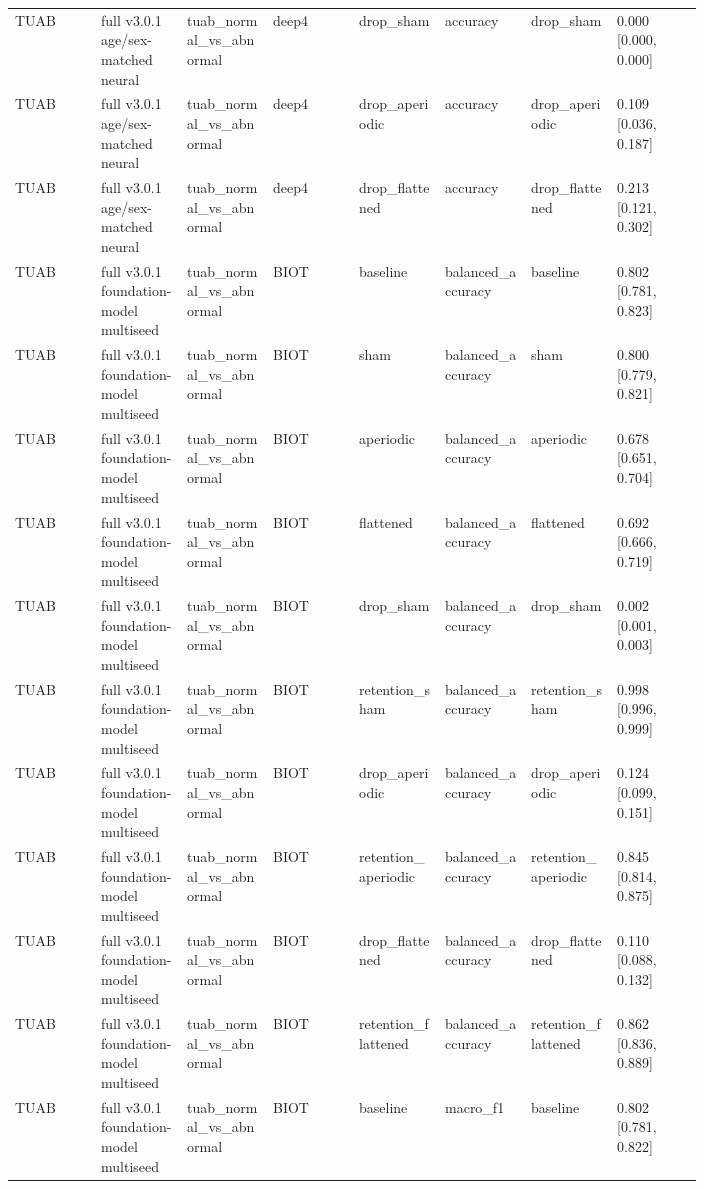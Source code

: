 \begin{longtable}{p{0.10\linewidth}p{0.10\linewidth}p{0.10\linewidth}p{0.10\linewidth}p{0.10\linewidth}p{0.10\linewidth}p{0.10\linewidth}p{0.10\linewidth}}
TUAB & full v3.0.1 age/sex-matched neural & tuab\_normal\_vs\_abnormal & deep4 & drop\_sham & accuracy & drop\_sham & 0.000 [0.000, 0.000]\\
TUAB & full v3.0.1 age/sex-matched neural & tuab\_normal\_vs\_abnormal & deep4 & drop\_aperiodic & accuracy & drop\_aperiodic & 0.109 [0.036, 0.187]\\
TUAB & full v3.0.1 age/sex-matched neural & tuab\_normal\_vs\_abnormal & deep4 & drop\_flattened & accuracy & drop\_flattened & 0.213 [0.121, 0.302]\\
TUAB & full v3.0.1 foundation-model multiseed & tuab\_normal\_vs\_abnormal & BIOT & baseline & balanced\_accuracy & baseline & 0.802 [0.781, 0.823]\\
TUAB & full v3.0.1 foundation-model multiseed & tuab\_normal\_vs\_abnormal & BIOT & sham & balanced\_accuracy & sham & 0.800 [0.779, 0.821]\\
TUAB & full v3.0.1 foundation-model multiseed & tuab\_normal\_vs\_abnormal & BIOT & aperiodic & balanced\_accuracy & aperiodic & 0.678 [0.651, 0.704]\\
TUAB & full v3.0.1 foundation-model multiseed & tuab\_normal\_vs\_abnormal & BIOT & flattened & balanced\_accuracy & flattened & 0.692 [0.666, 0.719]\\
TUAB & full v3.0.1 foundation-model multiseed & tuab\_normal\_vs\_abnormal & BIOT & drop\_sham & balanced\_accuracy & drop\_sham & 0.002 [0.001, 0.003]\\
TUAB & full v3.0.1 foundation-model multiseed & tuab\_normal\_vs\_abnormal & BIOT & retention\_sham & balanced\_accuracy & retention\_sham & 0.998 [0.996, 0.999]\\
TUAB & full v3.0.1 foundation-model multiseed & tuab\_normal\_vs\_abnormal & BIOT & drop\_aperiodic & balanced\_accuracy & drop\_aperiodic & 0.124 [0.099, 0.151]\\
TUAB & full v3.0.1 foundation-model multiseed & tuab\_normal\_vs\_abnormal & BIOT & retention\_aperiodic & balanced\_accuracy & retention\_aperiodic & 0.845 [0.814, 0.875]\\
TUAB & full v3.0.1 foundation-model multiseed & tuab\_normal\_vs\_abnormal & BIOT & drop\_flattened & balanced\_accuracy & drop\_flattened & 0.110 [0.088, 0.132]\\
TUAB & full v3.0.1 foundation-model multiseed & tuab\_normal\_vs\_abnormal & BIOT & retention\_flattened & balanced\_accuracy & retention\_flattened & 0.862 [0.836, 0.889]\\
TUAB & full v3.0.1 foundation-model multiseed & tuab\_normal\_vs\_abnormal & BIOT & baseline & macro\_f1 & baseline & 0.802 [0.781, 0.822]\\

\end{longtable}
